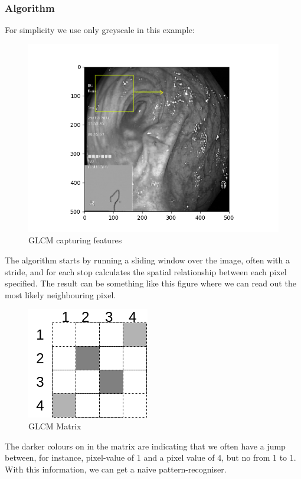         \subsubsection{Algorithm}
          For simplicity we use only greyscale in this example:
          \begin{figure}[ht]
        \centering
        \includegraphics[scale=0.5]{figures/sliding_window_box.png}
        \caption{GLCM capturing features}
          \end{figure}
          The algorithm starts by running a sliding window over the image, often with a stride, and for each stop calculates the spatial relationship between each pixel specified.
          The result can be something like this figure %
          where we can read out the most likely neighbouring pixel.
           \begin{figure}[ht]
        \centering
        \includegraphics[scale=0.5]{figures/Simple_GLCM.png}
        \caption{GLCM Matrix}
          \end{figure}
          The darker colours on in the matrix are indicating that we often have a jump between, for instance, pixel-value of 1 and a pixel value of 4, but no from 1 to 1.\\
          With this information, we can get a naive pattern-recogniser. 
